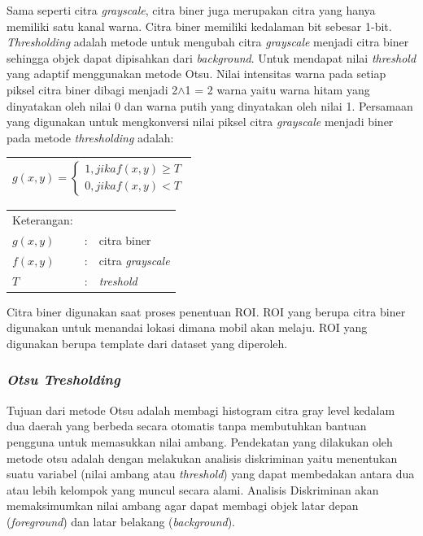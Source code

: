 Sama seperti citra \textit{grayscale}, citra biner juga merupakan citra yang hanya memiliki satu kanal warna. Citra biner memiliki kedalaman bit sebesar 1-bit. \textit{Thresholding} adalah metode untuk mengubah citra \textit{grayscale} menjadi citra biner sehingga objek dapat dipisahkan dari \textit{background}. Untuk mendapat nilai \textit{threshold} yang adaptif menggunakan metode Otsu. Nilai intensitas warna pada setiap piksel citra biner dibagi menjadi 2$\land$1 = 2 warna yaitu warna hitam yang dinyatakan oleh nilai 0 dan warna putih yang dinyatakan oleh nilai 1. Persamaan yang digunakan untuk mengkonversi nilai piksel citra \textit{grayscale} menjadi biner pada metode \textit{thresholding} adalah:

\begin{table}[H]
	\small
	\begin{adjustbox}{width=1\textwidth}
		\begin{tabular}{|p{13.55cm}|}
			\hline
			\begin{equation} \label{eqn:biner}
			\displaystyle
			g(x,y) = \left\{\begin{array}{l}1, jika f(x,y) \ge T \\0, jika f(x,y) < T\end{array}\right.
			\end{equation} \\
			\hline
		\end{tabular}
	\end{adjustbox}
\end{table}

\noindent
\renewcommand{\arraystretch}{1}
\begin{tabularx}{\textwidth}{lll}
	\hline
	Keterangan: \\
	$g(x,y)$ & : & citra biner\\
	$f(x,y)$ & : & citra \textit{grayscale}\\
	$T$ & : & \textit{treshold}\\
	\hline
\end{tabularx}
\vspace{4.5pt} 

Citra biner digunakan saat proses penentuan ROI. ROI yang berupa citra biner digunakan untuk menandai lokasi dimana mobil akan melaju. ROI yang digunakan berupa template dari dataset yang diperoleh.\\

\subsubsection{\textit{Otsu Tresholding}}
Tujuan dari metode Otsu adalah membagi histogram citra gray level kedalam dua daerah yang berbeda secara otomatis tanpa membutuhkan bantuan pengguna untuk memasukkan nilai ambang. Pendekatan yang dilakukan oleh metode otsu adalah dengan melakukan analisis diskriminan yaitu menentukan suatu variabel (nilai ambang atau \textit{threshold}) yang dapat membedakan antara dua atau lebih kelompok yang muncul secara alami. Analisis Diskriminan akan memaksimumkan nilai ambang agar dapat membagi objek latar depan (\textit{foreground}) dan latar belakang (\textit{background}).

